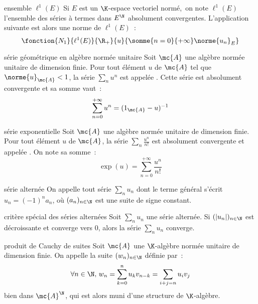 

\begin{adjustwidth}{-3cm}{-3cm}


\begin{definition}{6.16}{ensemble $\ell^1(E)$}
    Si $E$ est un $\K$-espace vectoriel normé,\, on note $\ell^1(E)$ l'ensemble des séries à termes dans $E^\N$ absolument convergentes. L'application suivante est alors une norme de $\ell^1(E)$~:
    $$\fonction{N_1}{\ell^1(E)}{\R_+}{u}{\somme{n=0}{+\infty}\norme{u_n}_E}$$
\end{definition}

\begin{definition}{6.19}{série géométrique en algèbre normée unitaire}
    Soit $\mc{A}$ une algèbre normée unitaire de dimension finie. Pour tout élément $u$ de $\mc{A}$ tel que $\norme{u}_{\mc{A}}<1$,  la série $\sum_n u^n$ est appelée . Cette série est absolument convergente et sa somme vaut~:
    $$\sum_{n=0}^{+\infty}u^n = (1_\mc{A} - u)^{-1}$$
\end{definition}

\begin{definition}{6.22}{série exponentielle}
   Soit $\mc{A}$ une algèbre normée unitaire de dimension finie. Pour tout élément $u$ de $\mc{A}$, la série $\displaystyle \sum_{n} \frac{u^n}{n!}$ est absolument convergente et appelée . On note sa somme~:
    $$\exp(u) = \sum_{n=0}^{+\infty}\frac{u^n}{n!}$$
\end{definition}

\begin{definition}{6.26}{série alternée}
    On appelle  tout série $\displaystyle \sum_{n} u_n$ dont le terme général s'écrit $u_n = (-1)^na_n$, où $(a_n)_{n \in \N}$ est une suite de signe constant.
\end{definition}

\begin{theoreme}{6.27}{critère spécial des séries alternées}
    Soit $\displaystyle \sum_{n} u_n$ une série alternée. Si $(|u_n|)_{n \in \N}$ est décroissante et converge vers $0$, alors la série $\displaystyle \sum_{n} u_n$ converge.
\end{theoreme}

\begin{definition}{6.30}{produit de Cauchy de suites}
    Soit $\mc{A}$ une $\K$-algèbre normée unitaire de dimension finie. On appelle  la suite $(w_n)_{n \in \N}$ définie par~:
    $$\forall n \in \N,\, w_n = \sum_{k=0}^{n}u_kv_{n-k} = \sum_{i+j = n}u_i v_j$$
   bien dans $\mc{A}^\N$, qui est alors muni d'une structure de $\K$-algèbre.
\end{definition}


\end{adjustwidth}
